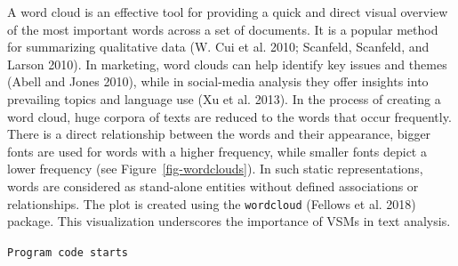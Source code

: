 A word cloud is an effective tool for providing a quick and
direct visual overview of the most important words across a set of
documents. It is a popular method for summarizing qualitative data (W.
Cui et al. 2010; Scanfeld, Scanfeld, and Larson 2010). In marketing, word clouds can help identify key issues and
themes (Abell and Jones 2010), while in social-media analysis they offer
insights into prevailing topics and language use (Xu et al. 2013). In
the process of creating a word cloud, huge corpora of texts are reduced
to the words that occur frequently. There is a direct relationship
between the words and their appearance, bigger fonts are used for words
with a higher frequency, while smaller fonts depict a lower
frequency (see Figure~\ref{fig-wordclouds}). In such static
representations, words are considered as stand-alone entities without
defined associations or relationships. The plot is created using the \texttt{wordcloud} (Fellows et al. 2018) package. This
visualization underscores the importance of VSMs in text analysis.

\texttt{Program\ code\ starts}

\begin{Shaded}
\begin{Highlighting}[]

\NormalTok{(}\NormalTok{)}

\NormalTok{(}
    \SpecialCharTok{$}
    \SpecialCharTok{$}
     \NormalTok{,              }
     \NormalTok{,           }
     \NormalTok{,      }
     \NormalTok{,            }
     \NormalTok{(}\NormalTok{, }\NormalTok{)       }
\NormalTok{)}
\end{Highlighting}
\end{Shaded}

